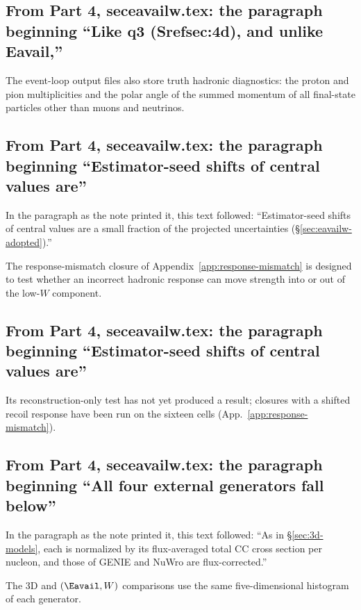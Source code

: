 \subsection{From Part 4, seceavailw.tex: the paragraph beginning ``Like q3 (Srefsec:4d), and unlike Eavail,''}
The event-loop output files also store truth hadronic diagnostics: the proton and pion multiplicities and the polar angle of the summed momentum of all final-state particles other than muons and neutrinos.

\subsection{From Part 4, seceavailw.tex: the paragraph beginning ``Estimator-seed shifts of central values are''}
In the paragraph as the note printed it, this text followed: ``Estimator-seed shifts of central values are a small fraction of the projected uncertainties (\S\ref{sec:eavailw-adopted}).''\par
The response-mismatch closure of Appendix~\ref{app:response-mismatch} is designed to test whether an incorrect hadronic response can move strength into or out of the low-$W$ component.

\subsection{From Part 4, seceavailw.tex: the paragraph beginning ``Estimator-seed shifts of central values are''}
Its reconstruction-only test has not yet produced a result; closures with a shifted recoil response have been run on the sixteen cells (App.~\ref{app:response-mismatch}).

\subsection{From Part 4, seceavailw.tex: the paragraph beginning ``All four external generators fall below''}
In the paragraph as the note printed it, this text followed: ``As in \S\ref{sec:3d-models}, each is normalized by its flux-averaged total CC cross section per nucleon, and those of GENIE and NuWro are flux-corrected.''\par
The 3D and $(\Eavail,W)$ comparisons use the same five-dimensional histogram of each generator.

